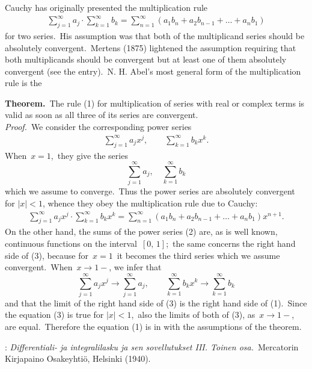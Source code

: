 \documentclass[12pt]{article}
\theoremstyle{definition}
\begin{document}
Cauchy has originally presented the multiplication rule 
\begin{align}
\sum_{j=1}^\infty{a_j}\cdot\sum_{k=1}^\infty{b_k} = \sum_{n=1}^\infty(a_1b_n+a_2b_{n-1}+\ldots+a_nb_1)
\end{align}
for two series. \,His assumption was that both of the multiplicand series should be absolutely convergent.\, Mertens (1875) lightened the assumption requiring that both multiplicands should be convergent but at least one of them absolutely convergent (see the  entry).\, N. H. Abel's most general form of the multiplication rule is the

\textbf{Theorem.}\, The rule (1) for multiplication of series with real or complex terms is valid as soon as all three of its series are convergent.\\

{\em Proof.}\, We consider the corresponding power series
\begin{align}
\sum_{j=1}^\infty{a_j}x^j, \qquad \sum_{k=1}^\infty{b_k}x^k.
\end{align}
When\, $x = 1$,\, they give the series
$$\sum_{j=1}^\infty{a_j}, \quad \sum_{k=1}^\infty{b_k}$$
which we assume to converge.\, Thus the power series are absolutely convergent for $|x| < 1$, whence they obey the multiplication rule due to Cauchy:
\begin{align}
\sum_{j=1}^\infty{a_j}x^j\cdot\sum_{k=1}^\infty{b_k}x^k = \sum_{n=1}^\infty(a_1b_n+a_2b_{n-1}+\ldots+a_nb_1)x^{n+1}.
\end{align}
On the other hand, the sums of the power series (2) are, as is well known, continuous functions on the interval \,$[0,\,1]$;\, the same concerns the right hand side of (3), because for\, $x = 1$\, it becomes the third series which we assume convergent.\, When\, $x \to 1-$, we infer that
$$\sum_{j=1}^\infty{a_j}x^j \to \sum_{j=1}^\infty{a_j}, \qquad \sum_{k=1}^\infty{b_k}x^k \to \sum_{k=1}^\infty{b_k}$$ 
and that the limit of the right hand side of (3) is the right hand side of (1).\, Since the equation (3) is true for $|x| < 1$,\, also the limits of both  of (3), as\, $x \to 1-$, are equal.\, Therefore the equation (1) is in  with the assumptions of the theorem.

\begin{thebibliography}{8}
: {\em Differentiali- ja integralilasku
ja sen sovellutukset III. Toinen osa.}\, Mercatorin Kirjapaino Osakeyhti\"o, Helsinki (1940).
\end{thebibliography}
\end{document}

